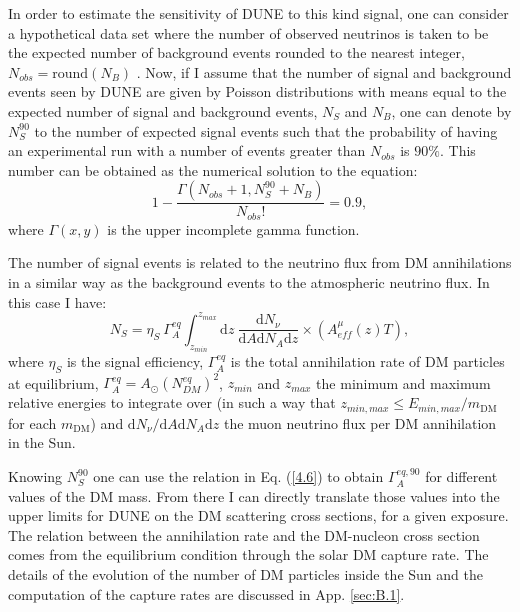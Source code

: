 In order to estimate the sensitivity of DUNE to this kind signal, one can consider a hypothetical data set where the number of observed neutrinos is taken to be the expected number of background events rounded to the nearest integer, $N_{obs} = \mathrm{round}(N_{B})$ \cite{Cowan2010}. Now, if I assume that the number of signal and background events seen by DUNE are given by Poisson distributions with means equal to the expected number of signal and background events, $N_{S}$ and $N_{B}$, one can denote by $N_{S}^{90}$ to the number of expected signal events such that the probability of having an experimental run with a number of events greater than $N_{obs}$ is $90\%$. This number can be obtained as the numerical solution to the equation:
\begin{equation}\label{4.5}
	1 - \frac{\Gamma\left(N_{obs}+1, N_{S}^{90}+N_{B}\right)}{N_{obs}!} = 0.9,
\end{equation}
where $\Gamma(x,y)$ is the upper incomplete gamma function.

The number of signal events is related to the neutrino flux from DM annihilations in a similar way as the background events to the atmospheric neutrino flux. In this case I have:
\begin{equation}\label{4.6}
	N_{S} = \eta_{S} \ \Gamma_{A}^{eq} \int_{z_{min}}^{z_{max}} \mathrm{d}z \ \frac{\mathrm{d}N_{\nu}}{\mathrm{d}A \mathrm{d}N_{A} \mathrm{d}z}  \times \left(A_{eff}^{\mu}(z) T\right),
\end{equation}
where $\eta_{S}$ is the signal efficiency, $\Gamma_{A}^{eq}$ is the total annihilation rate of DM particles at equilibrium, $\Gamma_{A}^{eq} = A_{\odot} \left(N_{DM}^{eq}\right)^{2}$, $z_{min}$ and $z_{max}$ the minimum and maximum relative energies to integrate over (in such a way that $z_{min, max} \leq E_{min, max}/m_{\mathrm{DM}}$ for each $m_{\mathrm{DM}}$) and $\mathrm{d}N_{\nu}/\mathrm{d}A \mathrm{d}N_{A} \mathrm{d}z$ the muon neutrino flux per DM annihilation in the Sun.

Knowing $N_{S}^{90}$ one can use the relation in Eq. (\ref{4.6}) to obtain $\Gamma_{A}^{eq,90}$ for different values of the DM mass. From there I can directly translate those values into the upper limits for DUNE on the DM scattering cross sections, for a given exposure. The relation between the annihilation rate and the DM-nucleon cross section comes from the equilibrium condition through the solar DM capture rate. The details of the evolution of the number of DM particles inside the Sun and the computation of the capture rates are discussed in App. \ref{sec:B.1}.

